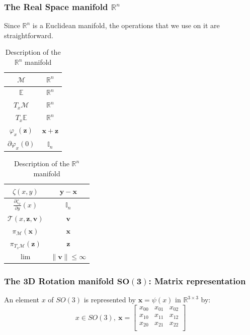 \subsubsection{The Real Space manifold $\mathbb{R}^n$}
\label{ssub:the_real_space}
Since $\mathbb{R}^n$ is a Euclidean manifold, the operations that we use on it are straightforward.

\begin{table} [H]
\caption{Description of the $\mathbb{R}^n$ manifold}
\centering
\begin{tabular}{cc}
  \toprule
  $\mathcal{M}$ & $\mathbb{R}^n$ \\
  \midrule
  $\mathbb{E}$ & $\mathbb{R}^n$ \\
  \midrule
  $T_x\mathcal{M}$ & $\mathbb{R}^n$ \\
  \midrule
  $T_x\mathbb{E}$ & $\mathbb{R}^n$ \\
  \midrule
  $\varphi_x(\mathbf{z})$ & $\mathbf{x} + \mathbf{z}$ \\
  \midrule
  $\partial \varphi_x(0)$ & $\mathbb{I}_n$ \\
  \bottomrule
\end{tabular}
\quad
\begin{tabular}{cc}
  \toprule
  $\zeta(x,y)$ & $\mathbf{y} - \mathbf{x}$ \\
  \midrule
  $\frac{\partial \zeta_x}{\partial y}(x)$ & $\mathbb{I}_n$ \\
  \midrule
  $\mathcal{T}(x,\mathbf{z}, \mathbf{v})$ & $\mathbf{v}$ \\
  \midrule
  $\pi_\mathcal{M}(\mathbf{x})$ & $\mathbf{x}$ \\
  \midrule
  $\pi_{T_x\mathcal{M}}(\mathbf{z})$ & $\mathbf{z}$ \\
  \midrule
  $\lim$ & $\|\mathbf{v}\| \leq \infty$ \\
  \bottomrule
\end{tabular}
\end{table}
\subsubsection{The 3D Rotation manifold $\mathbf{SO(3)}$: Matrix representation}
\label{ssub:the_3d_rotation_manifold_matrix_representation}

An element $x$ of $SO(3)$ is represented by $\mathbf{x}=\psi(x)$ in $\mathbb{R}^{3\times 3}$ by:
\begin{equation}
  x\in SO(3),\ \mathbf{x} =\begin{bmatrix}
    x_{00} & x_{01} & x_{02} \\
    x_{10} & x_{11} & x_{12} \\
    x_{20} & x_{21} & x_{22} \\
  \end{bmatrix}
\end{equation}


